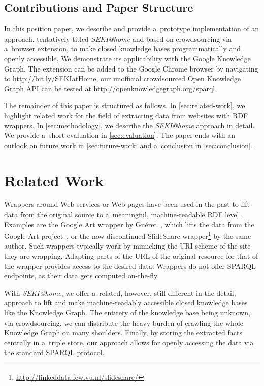 \documentclass[runningheads,a4paper]{llncs}
\begin{document}
\subsection{Contributions and Paper Structure}
In this position paper, we describe and provide a~prototype implementation
of an approach, tentatively titled \emph{SEKI@home} and
based on crowdsourcing via a~browser extension,
to make closed knowledge bases programmatically and openly accessible.
We demonstrate its applicability with the Google Knowledge Graph.
The extension can be added to the Google Chrome browser by navigating to
\url{http://bit.ly/SEKIatHome},
our unofficial crowdsourced Open Knowledge Graph API can be tested at
\url{http://openknowledgegraph.org/sparql}.

The remainder of this paper is structured as follows.
In \autoref{sec:related-work}, we highlight related work
for the field of extracting data from websites with RDF wrappers.
In \autoref{sec:methodology}, we describe the \emph{SEKI@home} approach in detail.
We provide a~short evaluation in \autoref{sec:evaluation}.
The paper ends with an outlook on future work in \autoref{sec:future-work}
and a~conclusion in \autoref{sec:conclusion}.

\section{Related Work} \label{sec:related-work}
Wrappers around Web services or Web pages have been used in the past
to lift data from the original source to a~meaningful, machine-readable RDF level.
Examples are the Google Art wrapper by Guéret~\cite{gueret2011},
which lifts the data from the Google Art project~\cite{sood2011},
or the now discontinued SlideShare wrapper\footnote{\url{http://linkeddata.few.vu.nl/slideshare/}} by the same author.
Such wrappers typically work by mimicking the URI scheme of the site they are wrapping.
Adapting parts of the URL of the original resource for that of the wrapper
provides access to the desired data.
Wrappers do not offer SPARQL endpoints, as their data gets computed on-the-fly.

With \emph{SEKI@home}, we offer a~related, however, still different in the detail,
approach to lift and make machine-readably accessible
closed knowledge bases like the Knowledge Graph.
The entirety of the knowledge base being unknown,
via crowdsourcing, we can distribute the heavy burden
of crawling the whole Knowledge Graph on many shoulders.
Finally, by storing the extracted facts centrally in a~triple store,
our approach allows for openly accessing the data via the standard SPARQL protocol.
\end{document}
